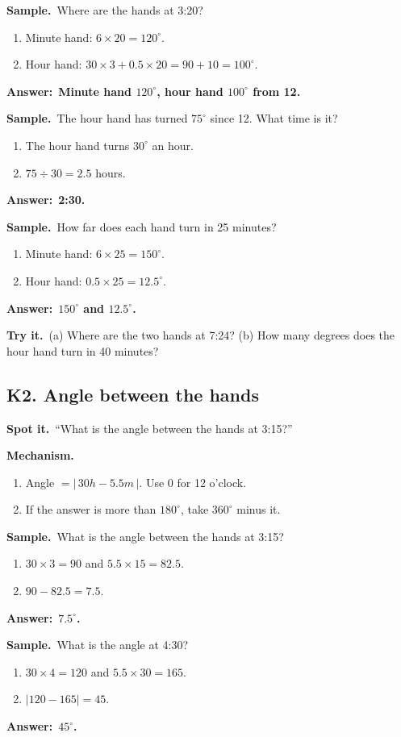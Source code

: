\documentclass[11pt,a4paper]{article}
\let\oldsubsection\subsection
\renewcommand{\subsection}{\needspace{9\baselineskip}\oldsubsection}
\newcommand{\spot}{\textbf{\color{ember}Spot it.}\ }
\newcommand{\mech}{\textbf{\color{ember}Mechanism.}\ }
\newif\ifkeepsamp
\newcommand{\ans}[1]{\par\nopagebreak\noindent\textbf{\color{ember}Answer:}\ \textbf{#1}\par}
\newcommand{\samp}{\ifkeepsamp\needspace{4\baselineskip}\fi\textbf{\color{ember}Sample.}\ }
\newcommand{\tryit}[1]{\textbf{\color{ember}Try it.}\ #1}
\begin{document}
\samp Where are the hands at 3:20?
\begin{enumerate}
\item Minute hand: $6 \times 20 = 120^\circ$.
\item Hour hand: $30 \times 3 + 0.5 \times 20 = 90 + 10 = 100^\circ$.
\end{enumerate}
\ans{Minute hand $120^\circ$, hour hand $100^\circ$ from 12.}

\samp The hour hand has turned $75^\circ$ since 12. What time is it?
\begin{enumerate}
\item The hour hand turns $30^\circ$ an hour.
\item $75 \div 30 = 2.5$ hours.
\end{enumerate}
\ans{2:30.}

\samp How far does each hand turn in 25 minutes?
\begin{enumerate}
\item Minute hand: $6 \times 25 = 150^\circ$.
\item Hour hand: $0.5 \times 25 = 12.5^\circ$.
\end{enumerate}
\ans{$150^\circ$ and $12.5^\circ$.}

\tryit (a) Where are the two hands at 7:24? (b) How many degrees does the hour hand turn in 40 minutes?

\subsection{K2. Angle between the hands}
\spot ``What is the angle between the hands at 3:15?''

\mech
\begin{enumerate}
\item Angle $= |\,30h - 5.5m\,|$. Use 0 for 12 o'clock.
\item If the answer is more than $180^\circ$, take $360^\circ$ minus it.
\end{enumerate}

\samp What is the angle between the hands at 3:15?
\begin{enumerate}
\item $30 \times 3 = 90$ and $5.5 \times 15 = 82.5$.
\item $90 - 82.5 = 7.5$.
\end{enumerate}
\ans{$7.5^\circ$.}

\samp What is the angle at 4:30?
\begin{enumerate}
\item $30 \times 4 = 120$ and $5.5 \times 30 = 165$.
\item $|120 - 165| = 45$.
\end{enumerate}
\ans{$45^\circ$.}
\end{document}
